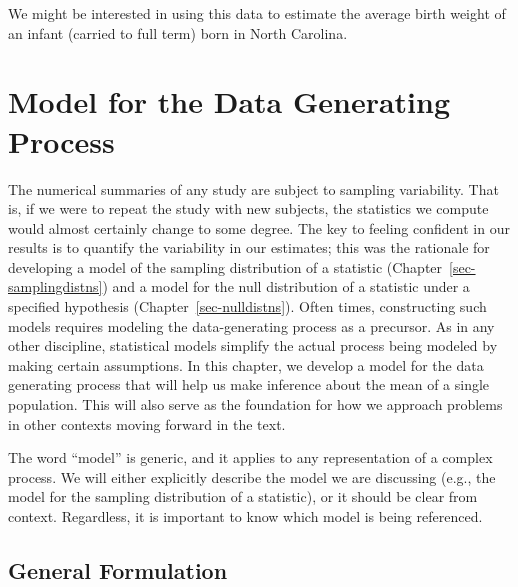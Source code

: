 \documentclass[
  letterpaper,
  DIV=11,
  numbers=noendperiod]{scrreprt}
\theoremstyle{plain}
\theoremstyle{definition}
\theoremstyle{definition}
\theoremstyle{remark}
\begin{document}
We might be interested in using this data to estimate the average birth
weight of an infant (carried to full term) born in North Carolina.

\chapter{Model for the Data Generating Process}\label{sec-meanmodels}

The numerical summaries of any study are subject to sampling
variability. That is, if we were to repeat the study with new subjects,
the statistics we compute would almost certainly change to some degree.
The key to feeling confident in our results is to quantify the
variability in our estimates; this was the rationale for developing a
model of the sampling distribution of a statistic
(Chapter~\ref{sec-samplingdistns}) and a model for the null distribution
of a statistic under a specified hypothesis
(Chapter~\ref{sec-nulldistns}). Often times, constructing such models
requires modeling the data-generating process as a precursor. As in any
other discipline, statistical models simplify the actual process being
modeled by making certain assumptions. In this chapter, we develop a
model for the data generating process that will help us make inference
about the mean of a single population. This will also serve as the
foundation for how we approach problems in other contexts moving forward
in the text.

\begin{tcolorbox}[enhanced jigsaw, breakable, titlerule=0mm, colframe=quarto-callout-note-color-frame, bottomtitle=1mm, opacityback=0, rightrule=.15mm, toptitle=1mm, arc=.35mm, bottomrule=.15mm, left=2mm, title=\textcolor{quarto-callout-note-color}{\faInfo}\hspace{0.5em}{Note}, leftrule=.75mm, coltitle=black, toprule=.15mm, colbacktitle=quarto-callout-note-color!10!white, colback=white, opacitybacktitle=0.6]

The word ``model'' is generic, and it applies to any representation of a
complex process. We will either explicitly describe the model we are
discussing (e.g., the model for the sampling distribution of a
statistic), or it should be clear from context. Regardless, it is
important to know which model is being referenced.

\end{tcolorbox}

\section{General Formulation}\label{general-formulation}
\end{document}
